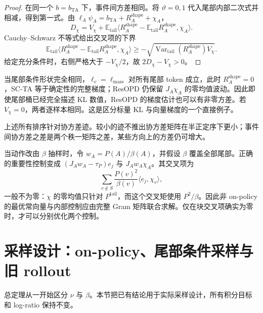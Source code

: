 \documentclass[lang=cn,scheme=chinese,openany]{../book/elegantbook}
\newcommand{\E}{\mathbb E}
\newcommand{\Var}{\operatorname{Var}}
\newcommand{\tail}{\mathrm{tail}}
\begin{document}
\begin{proof}
在同一个 $b=b_{\mathrm{TA}}$ 下，事件间方差相同。将 $\vartheta=0,1$ 代入尾部内部二次式并相减，得到第一式。由 $\ell_A\psi_A=b_{\mathrm{TA}}+R_A^{\mathrm{shape}}+\chi_A$，
\begin{equation*}
 D_\chi=V_\chi+\E_{\tail}\langle R_A^{\mathrm{shape}}-\E_{\tail}R_A^{\mathrm{shape}},\chi_A\rangle.
\end{equation*}
Cauchy--Schwarz 不等式给出交叉项的下界
\begin{equation*}
 \E_{\tail}\langle R_A^{\mathrm{shape}}-\E_{\tail}R_A^{\mathrm{shape}},\chi_A\rangle
 \geq-\sqrt{\Var_{\tail}(R_A^{\mathrm{shape}})V_\chi}.
\end{equation*}
给定充分条件时，右侧严格大于 $-V_\chi/2$，故 $2D_\chi-V_\chi>0$。
\end{proof}

当尾部条件形状完全相同，$\ell_v=\ell_{\mathrm{mass}}$ 对所有尾部 token 成立，此时 $R_A^{\mathrm{shape}}=0$，SC-TA 等于确定性的完整梯度；ResOPD 仍保留 $J_A\chi_A$ 的零均值波动。因此即使尾部桶已经完全描述 KL 数值，ResOPD 的梯度估计也可以有非零方差。若 $V_\chi=0$，两者逐样本相同。这是区分标量 KL 与向量梯度的一个直接例子。

上述所有排序针对协方差迹。较小的迹不推出协方差矩阵在半正定序下更小；事件间协方差之差是两个秩一矩阵之差，某些方向上的方差仍可增大。

当动作改由 $\beta$ 抽样时，令 $w_A=P(A)/\beta(A)$，并假设 $\beta$ 覆盖全部尾部。正确的重要性控制变成 $(J_Aw_A-\tau_P)e_j$ 与 $J_Aw_A\chi_A$。其交叉项为
\begin{equation*}
 \sum_{v\notin S}\frac{P(v)^2}{\beta(v)}\langle e_j,\chi_v\rangle,
\end{equation*}
一般不为零：$\chi$ 的零均值只针对 $P^{\tail}$，而这个交叉矩使用 $P^2/\beta$。因此非 on-policy 的最优常向量与内部控制应由完整 Gram 矩阵联合求解。仅在块交叉项确实为零时，才可以分别优化两个控制。



\section{采样设计：on-policy、尾部条件采样与旧 rollout}
\label{est:sec:kl-sampling}

总定理从一开始区分 $\nu$ 与 $\beta$。本节把已有结论用于实际采样设计，所有积分目标和 log-ratio 保持不变。
\end{document}
